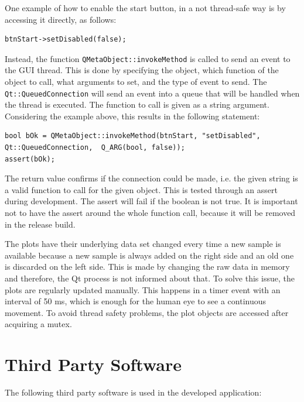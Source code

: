 One example of how to enable the start button, in a not thread-safe way is by accessing it directly, as follows: 

\begin{verbatim}  
btnStart->setDisabled(false);
\end{verbatim}

Instead, the function \texttt{QMetaObject::invokeMethod} is called to send an event to the GUI thread. This is done by specifying the object, which function of the object to call, what arguments to set, and the type of event to send. The \texttt{Qt::QueuedConnection} will send an event into a queue that will be handled when the thread is executed. The function to call is given as a string argument. Considering the example above, this results in the following statement:

\begin{verbatim}  
bool bOk = QMetaObject::invokeMethod(btnStart, "setDisabled", Qt::QueuedConnection,  Q_ARG(bool, false));
assert(bOk);
\end{verbatim}

The return value confirms if the connection could be made, i.e. the given string is a valid function to call for the given object. This is tested through an assert during development. The assert will fail if the boolean is not true. It is important not to have the assert around the whole function call, because it will be removed in the release build. 

The plots have their underlying data set changed every time a new sample is available because a new sample is always added on the right side and an old one is discarded on the left side. This is made by changing the raw data in memory and therefore, the Qt process is not informed about that. To solve this issue, the plots are regularly updated manually. This happens in a timer event with an interval of 50 ms, which is enough for the human eye to see a continuous movement. To avoid thread safety problems, the plot objects are accessed after acquiring a mutex.


\section{Third Party Software}

The following third party software is used in the developed application:


